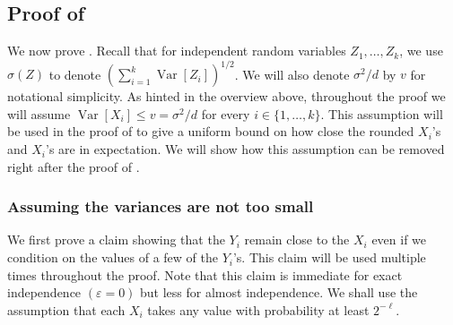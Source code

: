 \documentclass{toc}
\def\eps{\varepsilon}
\def\Blocklength{\ell}
\DeclareMathOperator*{\Var}{Var}                 %
\begin{document}
  \subsection{Proof of }
  We now prove .
  Recall that for independent random variables $Z_1, \ldots, Z_k$, we use $\sigma(Z)$ to denote $(\sum_{i = 1}^k \Var[Z_i])^{1/2}$.
  We will also denote $\sigma^2 / d$ by $v$ for notational simplicity.
  As hinted in the overview above, throughout the proof we will assume $\Var[X_i] \le v = \sigma^2 / d$ for every $i \in \{1, \ldots, k\}$.
	This assumption will be used in the proof of  to give a uniform bound on how close the rounded $X_i$'s and $X_i$'s are in expectation.
  We will show how this assumption can be removed right after the proof of .


	\subsubsection{Assuming the variances are not too small}

	We first prove a claim showing that the $Y_i$ remain close to the $X_i$ even if we condition on the values of a few of the $Y_i$'s.
	This claim will be used multiple times throughout the proof.
  Note that this claim is immediate for exact independence $(\eps = 0)$ but less for almost independence.
  We shall use the assumption that each $X_i$ takes any value with probability at least $2^{-\Blocklength}$.
\end{document}
